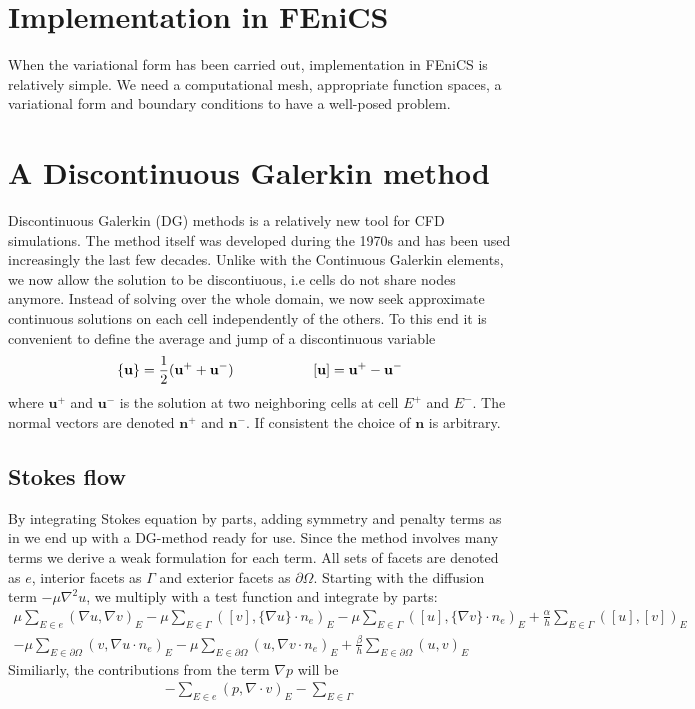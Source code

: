 \section{Implementation in FEniCS}
When the variational form has been carried out, implementation in FEniCS is relatively simple. We need a computational mesh, appropriate function spaces, a variational form and boundary conditions to have a well-posed problem. 
\\
\section{A Discontinuous Galerkin method}
Discontinuous Galerkin (DG) methods is a relatively new tool for CFD simulations. The method itself was developed during the 1970s and has been used increasingly the last few decades. Unlike with the Continuous Galerkin elements, we now allow the solution to be discontiuous, i.e cells do not share nodes anymore. Instead of solving over the whole domain, we now seek approximate continuous solutions on each cell independently of the others. To this end it is convenient to define the average and jump of a discontinuous variable
\begin{align} 
\{\mathbf{u}\} = \frac{1}{2}(\mathbf{u}^+ + \mathbf{u}^-) \hspace{2 cm}  [\mathbf{u}]  =  \mathbf{u}^+ - \mathbf{u}^- \label{Avg_jump}
\end{align}
where $\mathbf{u}^+$ and $\mathbf{u}^-$ is the solution at two neighboring cells at cell $E^+$ and $E^-$. The normal vectors are denoted $\mathbf{n}^+$ and $\mathbf{n}^-$. If consistent the choice of $\mathbf{n}$ is arbitrary. 
\subsection{Stokes flow}
By integrating Stokes equation by parts, adding symmetry and penalty terms as in \cite{Riviere2005} we end up with a DG-method ready for use. Since the method involves many terms we derive a weak formulation for each term. All sets of facets are denoted as $e$, interior facets as $\Gamma$ and exterior facets as $\partial \Omega$. Starting with the diffusion term $-\mu \nabla ^2 u$, we multiply with a test function and integrate by parts:
\begin{align}
	\mu \sum_{E \in e} (\nabla u, \nabla v)_E 
   -\mu \sum_{E \in \Gamma}([v], \{ \nabla u \} \cdot n_e)_E 
   -\mu \sum_{E \in \Gamma}([u], \{ \nabla v \} \cdot n_e)_E 
	+ \frac{\alpha}{h} \sum_{E \in \Gamma}([u],[v])_E \nonumber \\
	-\mu \sum_{E \in \partial \Omega}(v,  \nabla u \cdot n_e)_E 
   -\mu \sum_{E \in \partial \Omega}(u,  \nabla v  \cdot n_e)_E 
	+ \frac{\beta}{h} \sum_{E \in \partial \Omega}(u,v)_E 
 \label {Diffusion}
\end{align}
Similiarly, the contributions from the term $\nabla p$ will be
\begin{align}
	- \sum_{E \in e}(p, \nabla \cdot v)_E - \sum_{E \in \Gamma}
\end{align}
